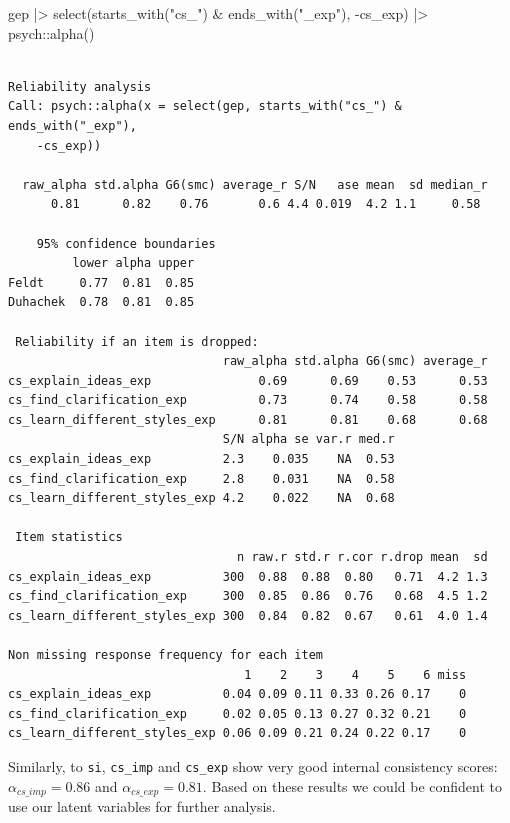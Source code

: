 \documentclass[
  letterpaper,
  DIV=11,
  numbers=noendperiod]{scrreprt}
\newenvironment{Shaded}{\begin{snugshade}}{\end{snugshade}}
\newcommand{\FunctionTok}[1]{\textcolor[rgb]{0.28,0.35,0.67}{#1}}
\newcommand{\NormalTok}[1]{\textcolor[rgb]{0.00,0.23,0.31}{#1}}
\newcommand{\SpecialCharTok}[1]{\textcolor[rgb]{0.37,0.37,0.37}{#1}}
\newcommand{\StringTok}[1]{\textcolor[rgb]{0.13,0.47,0.30}{#1}}
\begin{document}
\begin{Shaded}
\begin{Highlighting}[]
\NormalTok{gep }\SpecialCharTok{|\textgreater{}}
  \FunctionTok{select}\NormalTok{(}\FunctionTok{starts\_with}\NormalTok{(}\StringTok{"cs\_"}\NormalTok{) }\SpecialCharTok{\&} \FunctionTok{ends\_with}\NormalTok{(}\StringTok{"\_exp"}\NormalTok{), }\SpecialCharTok{{-}}\NormalTok{cs\_exp) }\SpecialCharTok{|\textgreater{}}
\NormalTok{  psych}\SpecialCharTok{::}\FunctionTok{alpha}\NormalTok{()}
\end{Highlighting}
\end{Shaded}

\begin{verbatim}

Reliability analysis   
Call: psych::alpha(x = select(gep, starts_with("cs_") & ends_with("_exp"), 
    -cs_exp))

  raw_alpha std.alpha G6(smc) average_r S/N   ase mean  sd median_r
      0.81      0.82    0.76       0.6 4.4 0.019  4.2 1.1     0.58

    95% confidence boundaries 
         lower alpha upper
Feldt     0.77  0.81  0.85
Duhachek  0.78  0.81  0.85

 Reliability if an item is dropped:
                              raw_alpha std.alpha G6(smc) average_r
cs_explain_ideas_exp               0.69      0.69    0.53      0.53
cs_find_clarification_exp          0.73      0.74    0.58      0.58
cs_learn_different_styles_exp      0.81      0.81    0.68      0.68
                              S/N alpha se var.r med.r
cs_explain_ideas_exp          2.3    0.035    NA  0.53
cs_find_clarification_exp     2.8    0.031    NA  0.58
cs_learn_different_styles_exp 4.2    0.022    NA  0.68

 Item statistics 
                                n raw.r std.r r.cor r.drop mean  sd
cs_explain_ideas_exp          300  0.88  0.88  0.80   0.71  4.2 1.3
cs_find_clarification_exp     300  0.85  0.86  0.76   0.68  4.5 1.2
cs_learn_different_styles_exp 300  0.84  0.82  0.67   0.61  4.0 1.4

Non missing response frequency for each item
                                 1    2    3    4    5    6 miss
cs_explain_ideas_exp          0.04 0.09 0.11 0.33 0.26 0.17    0
cs_find_clarification_exp     0.02 0.05 0.13 0.27 0.32 0.21    0
cs_learn_different_styles_exp 0.06 0.09 0.21 0.24 0.22 0.17    0
\end{verbatim}

Similarly, to \texttt{si}, \texttt{cs\_imp} and \texttt{cs\_exp} show
very good internal consistency scores: \(\alpha_{cs\_imp} = 0.86\) and
\(\alpha_{cs\_exp} = 0.81\). Based on these results we could be
confident to use our latent variables for further analysis.
\end{document}
